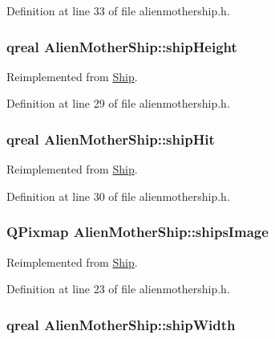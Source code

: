 Definition at line 33 of file alienmothership.h.\hypertarget{class_alien_mother_ship_acbf3b27133d490435d13650da53da1b0}{
\subsubsection[{shipHeight}]{\setlength{\rightskip}{0pt plus 5cm}qreal {\bf AlienMotherShip::shipHeight}}}
\label{class_alien_mother_ship_acbf3b27133d490435d13650da53da1b0}


Reimplemented from \hyperlink{class_ship_a16205aae21b89c3fb57960a70be931a2}{Ship}.

Definition at line 29 of file alienmothership.h.\hypertarget{class_alien_mother_ship_a06db4da9779e6346e7f05d3b39a8af0c}{
\subsubsection[{shipHit}]{\setlength{\rightskip}{0pt plus 5cm}qreal {\bf AlienMotherShip::shipHit}}}
\label{class_alien_mother_ship_a06db4da9779e6346e7f05d3b39a8af0c}


Reimplemented from \hyperlink{class_ship_a1fd726a67e6b11d5ce19f4657db40237}{Ship}.

Definition at line 30 of file alienmothership.h.\hypertarget{class_alien_mother_ship_a61fef30fd35cb950ff5c23463da32adf}{
\subsubsection[{shipsImage}]{\setlength{\rightskip}{0pt plus 5cm}QPixmap {\bf AlienMotherShip::shipsImage}}}
\label{class_alien_mother_ship_a61fef30fd35cb950ff5c23463da32adf}


Reimplemented from \hyperlink{class_ship_a3e61137191ddd959a57e0cd8928b4873}{Ship}.

Definition at line 23 of file alienmothership.h.\hypertarget{class_alien_mother_ship_af38d6c7fb520033527b5012f0ae60654}{
\subsubsection[{shipWidth}]{\setlength{\rightskip}{0pt plus 5cm}qreal {\bf AlienMotherShip::shipWidth}}}
\label{class_alien_mother_ship_af38d6c7fb520033527b5012f0ae60654}


